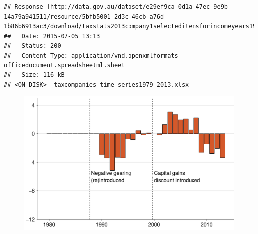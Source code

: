 \documentclass{grattan}\usepackage[]{graphicx}\usepackage[]{color}
\makeatletter
\newenvironment{kframe}{%
 \def\at@end@of@kframe{}%
 \ifinner\ifhmode%
  \def\at@end@of@kframe{\end{minipage}}%
  \begin{minipage}{\columnwidth}%
 \fi\fi%
 \def\FrameCommand##1{\hskip\@totalleftmargin \hskip-\fboxsep
 \colorbox{shadecolor}{##1}\hskip-\fboxsep
     \hskip-\linewidth \hskip-\@totalleftmargin \hskip\columnwidth}%
 \MakeFramed {\advance\hsize-\width
   \@totalleftmargin\z@ \linewidth\hsize
   \@setminipage}}%
 {\par\unskip\endMakeFramed%
 \at@end@of@kframe}
\newenvironment{knitrout}{}{} %
\makeatother
\begin{document}
\begin{knitrout}
\color{fgcolor}\begin{kframe}
\begin{verbatim}
## Response [http://data.gov.au/dataset/e29ef9ca-0d1a-47ec-9e9b-14a79a941511/resource/5bfb5001-2d3c-46cb-a76d-1b86b6913ac3/download/taxstats2013company1selecteditemsforincomeyears197980to201213.xlsx]
##   Date: 2015-07-05 13:13
##   Status: 200
##   Content-Type: application/vnd.openxmlformats-officedocument.spreadsheetml.sheet
##   Size: 116 kB
## <ON DISK>  taxcompanies_time_series1979-2013.xlsx
\end{verbatim}
\end{kframe}
\end{knitrout}


\begin{figure}[t]
\includegraphics[width=\columnwidth]{figure/Net_rent_over_time_companies-1}
\end{figure}
\end{document}
